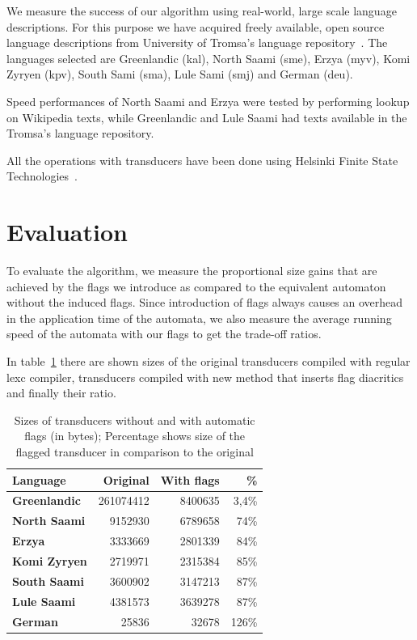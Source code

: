 \documentclass[11pt]{article}
\begin{document}
We measure the success of our algorithm using real-world, large scale language
descriptions. For this purpose we have acquired freely available, open source
language descriptions from University of Tromsa's language 
repository~\cite{moshagen2013building}. The languages selected are Greenlandic (kal), 
North Saami (sme), Erzya (myv), Komi Zyryen (kpv), South Sami (sma), Lule Sami (smj) and German (deu).

Speed performances of North Saami and Erzya were tested by performing lookup on Wikipedia texts, while Greenlandic and Lule Saami had texts available
 in the Tromsa's language repository.
 
 All the operations with transducers have been done using Helsinki Finite State Technologies~\cite{linden2011}.



\section{Evaluation}
\label{sec:evaluation}

To evaluate the algorithm, we measure the proportional size gains that are
achieved by the flags we introduce as compared to the equivalent automaton
without the induced flags. Since introduction of flags always causes an overhead in the
application time of the automata, we also measure the average running speed
of the automata with our flags to get the trade-off ratios.

In table~\ref{table:sizes} there are shown sizes of the original transducers compiled with regular lexc compiler, transducers compiled with new method that inserts flag diacritics and finally their ratio.

\begin{table}
    \centering
    \begin{tabular}{|l|r|r|r|}
        \hline
        \bf Language & \bf Original & \bf With flags & \bf \% \\
        \hline
        \bf Greenlandic &	261074412 	& 8400635 & 3,4\%  \\
        \bf North Saami &	9152930 	& 6789658 & 74\%  \\
        \bf Erzya		&	3333669 	& 2801339 & 84\%  \\
        \bf Komi Zyryen &	2719971 	& 2315384 & 85\%  \\
        \bf South Saami &	3600902 	& 3147213 & 87\%  \\
        \bf Lule Saami 	&	4381573 	& 3639278 & 87\%  \\
        \bf German 		&	25836 		& 32678   & 126\%  \\
        \hline
    \end{tabular}
    \caption{Sizes of transducers without and with automatic flags (in bytes); Percentage shows size of the flagged transducer in comparison to the original
    \label{table:sizes}}
\end{table}
\end{document}
